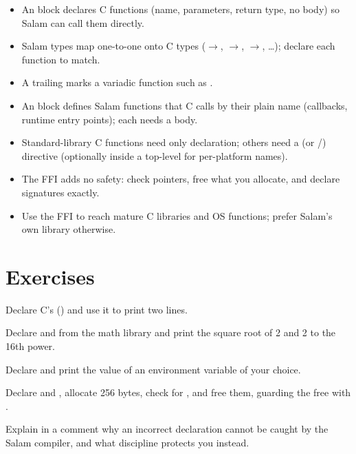 \begin{itemize}[leftmargin=1.4em]
  \item An  block declares C functions (name, parameters,
        return type, no body) so Salam can call them directly.
  \item Salam types map one-to-one onto C types ($\to$,
        $\to$, $\to$, \dots);
        declare each function to match.
  \item A trailing  marks a variadic function such as .
  \item An  block defines Salam functions that C calls by their
        plain name (callbacks, runtime entry points); each needs a body.
  \item Standard-library C functions need only declaration; others need a
         (or /) directive
        (optionally inside a top-level  for per-platform names).
  \item The FFI adds no safety: check pointers, free what you allocate, and
        declare signatures exactly.
  \item Use the FFI to reach mature C libraries and OS functions; prefer Salam's
        own library otherwise.
\end{itemize}

\section{Exercises}

\exercise Declare C's  () and use it to print
two lines.

\exercise Declare  and  from the math library and print the
square root of 2 and 2 to the 16th power.

\exercise Declare  and print the value of an environment
variable of your choice.

\exercise Declare  and , allocate 256 bytes, check for
, and free them, guarding the free with .

\exercise Explain in a comment why an incorrect  declaration cannot be
caught by the Salam compiler, and what discipline protects you instead.
